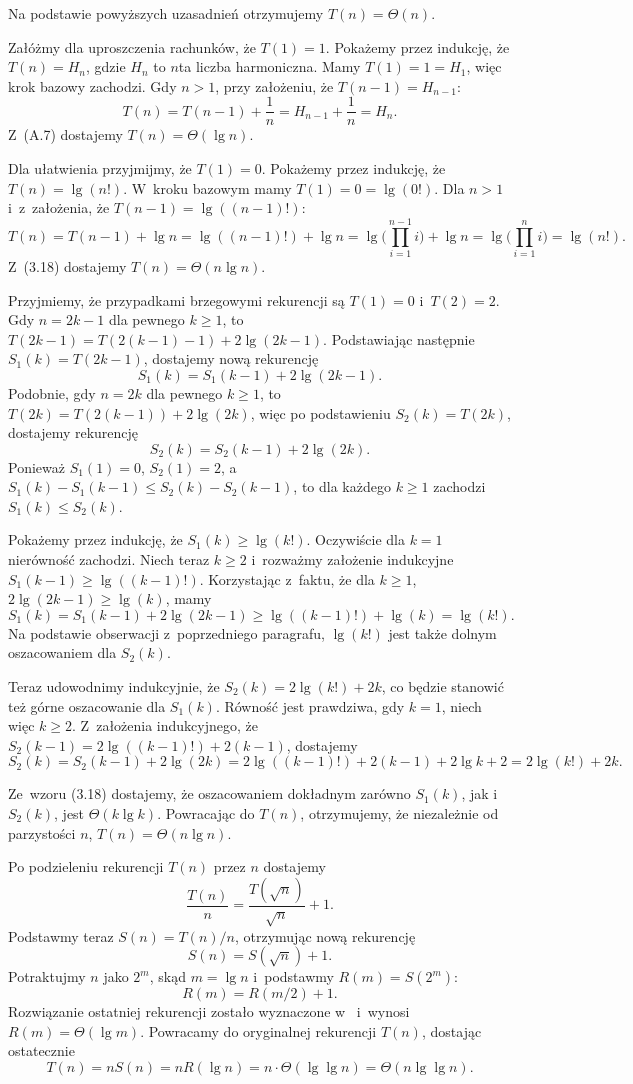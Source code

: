 Na podstawie powyższych uzasadnień otrzymujemy $T(n)=\Theta(n)$.

\subproblem %
Załóżmy dla uproszczenia rachunków, że $T(1)=1$.
Pokażemy przez indukcję, że $T(n)=H_n$, gdzie $H_n$ to $n$\nbhyphen ta liczba harmoniczna.
Mamy $T(1)=1=H_1$, więc krok bazowy zachodzi.
Gdy $n>1$, przy założeniu, że $T(n-1)=H_{n-1}$:
\[
	T(n) = T(n-1)+\frac{1}{n} = H_{n-1}+\frac{1}{n} = H_n.
\]
Z~(A.7) dostajemy $T(n)=\Theta(\lg n)$.

\subproblem %
Dla ułatwienia przyjmijmy, że $T(1)=0$.
Pokażemy przez indukcję, że $T(n)=\lg(n!)$.
W~kroku bazowym mamy $T(1)=0=\lg(0!)$.
Dla $n>1$ i~z~założenia, że $T(n-1)=\lg((n-1)!)$:
\[
	T(n) = T(n-1)+\lg n = \lg((n-1)!)+\lg n = \lg\biggl(\prod_{i=1}^{n-1}i\biggr)+\lg n = \lg\biggl(\prod_{i=1}^ni\biggr) = \lg(n!).
\]
Z~(3.18) dostajemy $T(n)=\Theta(n\lg n)$.

\subproblem %
Przyjmiemy, że przypadkami brzegowymi rekurencji są $T(1)=0$ i~$T(2)=2$.
Gdy $n=2k-1$ dla pewnego $k\ge1$, to $T(2k-1)=T(2(k-1)-1)+2\lg(2k-1)$.
Podstawiając następnie $S_1(k)=T(2k-1)$, dostajemy nową rekurencję
\[
	S_1(k) = S_1(k-1)+2\lg(2k-1).
\]
Podobnie, gdy $n=2k$ dla pewnego $k\ge1$, to $T(2k)=T(2(k-1))+2\lg(2k)$, więc po podstawieniu $S_2(k)=T(2k)$, dostajemy rekurencję
\[
	S_2(k) = S_2(k-1)+2\lg(2k).
\]
Ponieważ $S_1(1)=0$, $S_2(1)=2$, a~$S_1(k)-S_1(k-1)\le S_2(k)-S_2(k-1)$, to dla każdego $k\ge1$ zachodzi $S_1(k)\le S_2(k)$.

Pokażemy przez indukcję, że $S_1(k)\ge\lg(k!)$.
Oczywiście dla $k=1$ nierówność zachodzi.
Niech teraz $k\ge2$ i~rozważmy założenie indukcyjne $S_1(k-1)\ge\lg((k-1)!)$.
Korzystając z~faktu, że dla $k\ge1$, $2\lg(2k-1)\ge\lg(k)$, mamy
\[
	S_1(k) = S_1(k-1)+2\lg(2k-1) \ge \lg((k-1)!)+\lg(k) = \lg(k!).
\]
Na podstawie obserwacji z~poprzedniego paragrafu, $\lg(k!)$ jest także dolnym oszacowaniem dla $S_2(k)$.

Teraz udowodnimy indukcyjnie, że $S_2(k)=2\lg(k!)+2k$, co będzie stanowić też górne oszacowanie dla $S_1(k)$.
Równość jest prawdziwa, gdy $k=1$, niech więc $k\ge2$.
Z~założenia indukcyjnego, że $S_2(k-1)=2\lg((k-1)!)+2(k-1)$, dostajemy
\[
	S_2(k) = S_2(k-1)+2\lg(2k) = 2\lg((k-1)!)+2(k-1)+2\lg k+2 = 2\lg(k!)+2k.
\]

Ze~wzoru (3.18) dostajemy, że oszacowaniem dokładnym zarówno $S_1(k)$, jak i~$S_2(k)$, jest $\Theta(k\lg k)$.
Powracając do $T(n)$, otrzymujemy, że niezależnie od parzystości $n$, $T(n)=\Theta(n\lg n)$.

\subproblem %
Po podzieleniu rekurencji $T(n)$ przez $n$ dostajemy
\[
	\frac{T(n)}{n} = \frac{T(\!\sqrt{n})}{\sqrt{n}}+1.
\]
Podstawmy teraz $S(n)=T(n)/n$, otrzymując nową rekurencję
\[
	S(n) = S(\!\sqrt{n})+1.
\]
Potraktujmy $n$ jako $2^m$, skąd $m=\lg n$ i~podstawmy $R(m)=S(2^m)$:
\[
	R(m) = R(m/2)+1.
\]
Rozwiązanie ostatniej rekurencji zostało wyznaczone w~ i~wynosi $R(m)=\Theta(\lg m)$.
Powracamy do oryginalnej rekurencji $T(n)$, dostając ostatecznie
\[
	T(n) = nS(n) = nR(\lg n) = n\cdot\Theta(\lg\lg n) = \Theta(n\lg\lg n).
\]
